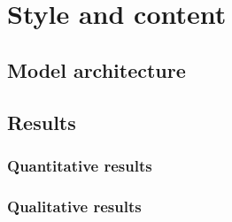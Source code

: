 \chapter{Style and content}
\section{Model architecture}
\section{Results}
\subsection{Quantitative results}
\subsection{Qualitative results}

